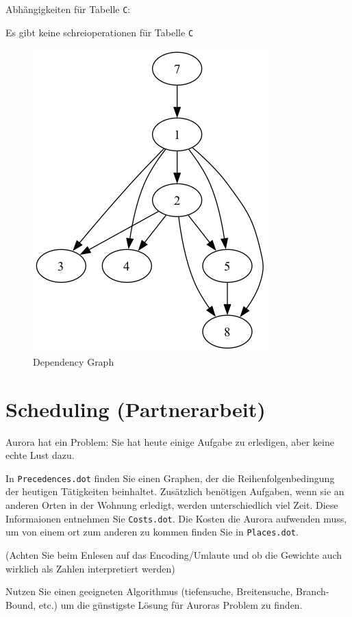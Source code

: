 \documentclass[a4paper,11pt]{report}
\begin{document}
Abhängigkeiten für Tabelle \texttt{C}:

Es gibt keine schreioperationen für Tabelle \texttt{C}

\begin{figure}[htbp]
    \includegraphics[height=0.2\textheight]{notebooks/assets/aufgabe_02/dependency_graph}
    \caption{Dependency Graph}
    \label{fig:a02_dependency_graph}
\end{figure}

\newpage

\chapter{Scheduling (Partnerarbeit)}

Aurora hat ein Problem: Sie hat heute einige Aufgabe zu erledigen, aber keine echte Lust dazu.

In \texttt{Precedences.dot} finden Sie einen Graphen, der die Reihenfolgenbedingung der heutigen Tätigkeiten beinhaltet.
Zusätzlich benötigen Aufgaben, wenn sie an anderen Orten in der Wohnung erledigt, werden unterschiedlich viel Zeit.
Diese Informaionen entnehmen Sie \texttt{Costs.dot}.
Die Kosten die Aurora aufwenden muss, um von einem ort zum anderen zu kommen finden Sie in \texttt{Places.dot}.

(Achten Sie beim Enlesen auf das Encoding/Umlaute und ob die Gewichte auch wirklich als Zahlen interpretiert werden)

Nutzen Sie einen geeigneten Algorithmus (tiefensuche, Breitensuche, Branch-Bound, etc.) um die günstigste Lösung für Auroras Problem zu finden.
\end{document}
